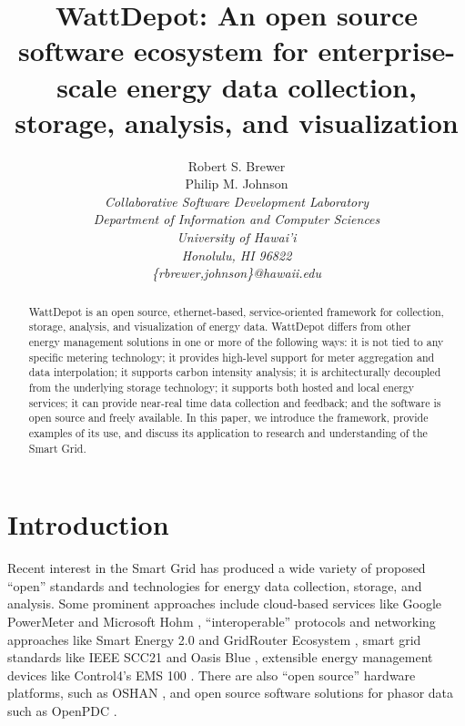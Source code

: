 \documentclass[conference,compsoc]{IEEEtran}
\begin{document}
\title{WattDepot: An open source software ecosystem for enterprise-scale
  energy data collection, storage, analysis, and visualization}

\author{Robert S. Brewer\\
        Philip M. Johnson \\
\em     Collaborative Software Development Laboratory \\
        Department of Information and Computer Sciences \\
        University of Hawai'i \\
        Honolulu, HI 96822 \\
        \{rbrewer,johnson\}@hawaii.edu \\
}


\maketitle

\begin{abstract}  %
  WattDepot is an open source, ethernet-based, service-oriented framework 
  for collection, storage, analysis, and visualization of energy data.
  WattDepot differs from other energy management solutions in one or more
  of the following ways: it is not tied to any specific metering
  technology; it provides high-level support for meter aggregation and data
  interpolation; it supports carbon intensity analysis; it is
  architecturally decoupled from the underlying storage technology; it
  supports both hosted and local energy services; it can provide near-real
  time data collection and feedback; and the software is open source and
  freely available.  In this paper, we introduce the framework, provide
  examples of its use, and discuss its application to research and
  understanding of the Smart Grid.
\end{abstract}


\section{Introduction}
\label{sec:intro}

Recent interest in the Smart Grid has produced a wide variety of proposed
``open'' standards and technologies for energy data collection, storage,
and analysis.  Some prominent approaches include cloud-based services like
Google PowerMeter \cite{GooglePowerMeter} and Microsoft Hohm
\cite{MicrosoftHohm}, ``interoperable'' protocols and networking approaches
like Smart Energy 2.0 \cite{SmartEnergy2.0} and GridRouter Ecosystem
\cite{GridRouterEcosystem}, smart grid standards like IEEE SCC21
\cite{IEEESCC21} and Oasis Blue \cite{OasisBlue}, extensible energy
management devices like Control4's EMS 100 \cite{EMS100}.  There are also
``open source'' hardware platforms, such as OSHAN \cite{OSHAN}, and open
source software solutions for phasor data such as OpenPDC \cite{OpenPDC}.
\end{document}
